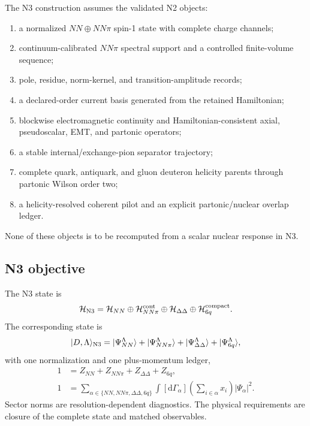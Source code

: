 \documentclass[11pt]{article}
\newcommand{\dd}{\mathrm{d}}
\newcommand{\Hil}{\mathcal H}
\newcommand{\HNthree}{\Hil_{\mathrm{N3}}}
\newcommand{\HDD}{\Hil_{\Delta\Delta}}
\newcommand{\Hsix}{\Hil_{6q}^{\mathrm{compact}}}
\begin{document}
The N3 construction assumes the validated N2 objects:
\begin{enumerate}
\item a normalized \(NN\oplus NN\pi\) spin-1 state with complete charge channels;
\item continuum-calibrated \(NN\pi\) spectral support and a controlled finite-volume sequence;
\item pole, residue, norm-kernel, and transition-amplitude records;
\item a declared-order current basis generated from the retained Hamiltonian;
\item blockwise electromagnetic continuity and Hamiltonian-consistent axial, pseudoscalar, EMT, and partonic operators;
\item a stable internal/exchange-pion separator trajectory;
\item complete quark, antiquark, and gluon deuteron helicity parents through partonic Wilson order two;
\item a helicity-resolved coherent pilot and an explicit partonic/nuclear overlap ledger.
\end{enumerate}
None of these objects is to be recomputed from a scalar nuclear response in N3.

\subsection{N3 objective}

The N3 state is
\begin{equation}
 \HNthree
 =\Hil_{NN}
 \oplus\Hil_{NN\pi}^{\rm cont}
 \oplus\HDD
 \oplus\Hsix.
\label{eq:n3-hilbert}
\end{equation}
The corresponding state is
\begin{equation}
 |D,\Lambda\rangle_{\rm N3}
 =|\Psi_{NN}^{\Lambda}\rangle
 +|\Psi_{NN\pi}^{\Lambda}\rangle
 +|\Psi_{\Delta\Delta}^{\Lambda}\rangle
 +|\Psi_{6q}^{\Lambda}\rangle,
\label{eq:n3-state}
\end{equation}
with one normalization and one plus-momentum ledger,
\begin{align}
 1&=Z_{NN}+Z_{NN\pi}+Z_{\Delta\Delta}+Z_{6q},
\label{eq:n3-normalization}\\
 1&=\sum_{\alpha\in\{NN,NN\pi,\Delta\Delta,6q\}}
 \int[\dd\Gamma_\alpha]
 \left(\sum_{i\in\alpha}x_i\right)
 |\Psi_\alpha|^2.
\label{eq:n3-momentum-ledger}
\end{align}
Sector norms are resolution-dependent diagnostics.  The physical requirements are closure of the complete state and matched observables.
\end{document}

